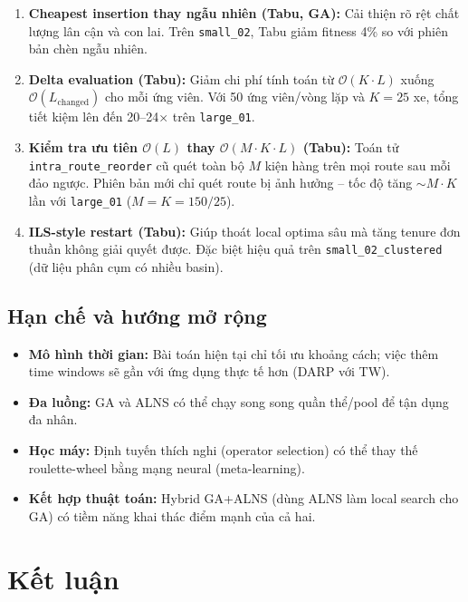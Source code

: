 \documentclass[12pt, a4paper]{article}
\begin{document}
\begin{enumerate}
  \item \textbf{Cheapest insertion thay ngẫu nhiên (Tabu, GA):} Cải thiện rõ rệt chất lượng lân cận và con lai. Trên \texttt{small\_02}, Tabu giảm fitness 4\% so với phiên bản chèn ngẫu nhiên.

  \item \textbf{Delta evaluation (Tabu):} Giảm chi phí tính toán từ $\mathcal{O}(K \cdot L)$ xuống $\mathcal{O}(L_{\text{changed}})$ cho mỗi ứng viên. Với 50 ứng viên/vòng lặp và $K=25$ xe, tổng tiết kiệm lên đến 20--24× trên \texttt{large\_01}.

  \item \textbf{Kiểm tra ưu tiên $\mathcal{O}(L)$ thay $\mathcal{O}(M \cdot K \cdot L)$ (Tabu):} Toán tử \texttt{intra\_route\_reorder} cũ quét toàn bộ $M$ kiện hàng trên mọi route sau mỗi đảo ngược. Phiên bản mới chỉ quét route bị ảnh hưởng -- tốc độ tăng $\sim M \cdot K$ lần với \texttt{large\_01} ($M=K=150/25$).

  \item \textbf{ILS-style restart (Tabu):} Giúp thoát local optima sâu mà tăng tenure đơn thuần không giải quyết được. Đặc biệt hiệu quả trên \texttt{small\_02\_clustered} (dữ liệu phân cụm có nhiều basin).
\end{enumerate}

\subsection{Hạn chế và hướng mở rộng}

\begin{itemize}
  \item \textbf{Mô hình thời gian:} Bài toán hiện tại chỉ tối ưu khoảng cách; việc thêm time windows sẽ gần với ứng dụng thực tế hơn (DARP với TW).
  \item \textbf{Đa luồng:} GA và ALNS có thể chạy song song quần thể/pool để tận dụng đa nhân.
  \item \textbf{Học máy:} Định tuyến thích nghi (operator selection) có thể thay thế roulette-wheel bằng mạng neural (meta-learning).
  \item \textbf{Kết hợp thuật toán:} Hybrid GA+ALNS (dùng ALNS làm local search cho GA) có tiềm năng khai thác điểm mạnh của cả hai.
\end{itemize}

\section{Kết luận}
\end{document}
